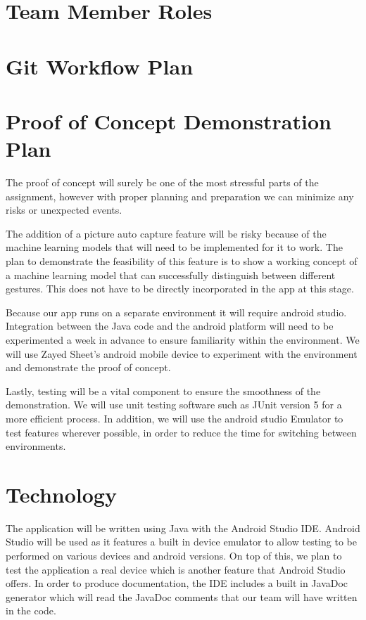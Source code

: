 \documentclass{article}
\begin{document}
\section{Team Member Roles}

\section{Git Workflow Plan}

\section{Proof of Concept Demonstration Plan}

The proof of concept will surely be one of the most stressful parts of the assignment, however with proper planning and preparation we can minimize any risks or unexpected events. 

The addition of a picture auto capture feature will be risky because of the machine learning models that will need to be implemented for it to work. The plan to demonstrate the feasibility of this feature is to show a working concept of a machine learning model that can successfully distinguish between different gestures. This does not have to be directly incorporated in the app at this stage.

Because our app runs on a separate environment it will require android studio. Integration between the Java code and the android platform will need to be experimented a week in advance to ensure familiarity within the environment. We will use Zayed Sheet’s android mobile device to experiment with the environment and demonstrate the proof of concept. 

Lastly, testing will be a vital component to ensure the smoothness of the demonstration. We will use unit testing software such as JUnit version 5 for a more efficient process. In addition, we will use the android studio Emulator to test features wherever possible, in order to reduce the time for switching between environments. 


\section{Technology}

The application will be written using Java with the Android Studio IDE. Android Studio will be used as it features a built in device emulator to allow testing to be performed on various devices and android versions. On top of this, we plan to test the application a real device which is another feature that Android Studio offers. In order to produce documentation, the IDE includes a built in JavaDoc generator which will read the JavaDoc comments that our team will have written in the code.
\end{document}

